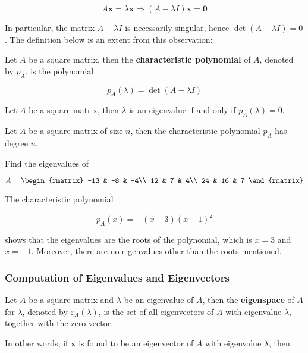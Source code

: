 \documentclass[a4paper,12pt]{article}
\begin{document}
$$A\mathbf{x}=\lambda\mathbf{x}\Rightarrow(A-\lambda I)\mathbf{x}=\mathbf{0}$$\s

In particular, the matrix $A-\lambda I$ is necessarily singular, hence $\det(A-\lambda I)=0$. The definition below is an extent from this observation:

\begin{dft}
  Let $A$ be a square matrix, then the \textbf{characteristic polynomial} of $A$, denoted by $p_{A}$, is the polynomial

  $$p_{A}(\lambda)=\det(A-\lambda I)$$
\end{dft}\n

\begin{thm}
  Let $A$ be a square matrix, then $\lambda$ is an eigenvalue if and only if $p_{A}(\lambda)=0$.
\end{thm}\n

\begin{thm}
  Let $A$ be a square matrix of size $n$, then the characteristic polynomial $p_{A}$ has degree $n$.
\end{thm}\n

\begin{exm}
  Find the eigenvalues of

  $$A=\begin{rmatrix}
    -13 & -8 & -4\\
    12 & 7 & 4\\
    24 & 16 & 7
  \end{rmatrix}$$\s

  \ans The characteristic polynomial

  $$p_{A}(x)=-(x-3)(x+1)^{2}$$\s

  shows that the eigenvalues are the roots of the polynomial, which is $x=3$ and $x=-1$. Moreover, there are no eigenvalues other than the roots mentioned.
\end{exm}\n

\subsubsection{Computation of Eigenvalues and Eigenvectors}
\begin{dft}
  Let $A$ be a square matrix and $\lambda$ be an eigenvalue of $A$, then the \textbf{eigenspace} of $A$ for $\lambda$, denoted by $\varepsilon_{A}(\lambda)$, is the set of all eigenvectors of $A$ with eigenvalue $\lambda$, together with the zero vector.
\end{dft}\n

In other words, if $\mathbf{x}$ is found to be an eigenvector of $A$ with eigenvalue $\lambda$, then
\end{document}
